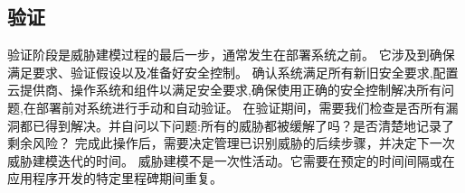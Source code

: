 \subsection{验证}

验证阶段是威胁建模过程的最后一步，通常发生在部署系统之前。 它涉及到确保满足要求、验证假设以及准备好安全控制。
确认系统满足所有新旧安全要求,配置云提供商、操作系统和组件以满足安全要求,确保使用正确的安全控制解决所有问题,在部署前对系统进行手动和自动验证。
在验证期间，需要我们检查是否所有漏洞都已得到解决。并自问以下问题:所有的威胁都被缓解了吗？是否清楚地记录了剩余风险？
完成此操作后，需要决定管理已识别威胁的后续步骤，并决定下一次威胁建模迭代的时间。
威胁建模不是一次性活动。它需要在预定的时间间隔或在应用程序开发的特定里程碑期间重复。

